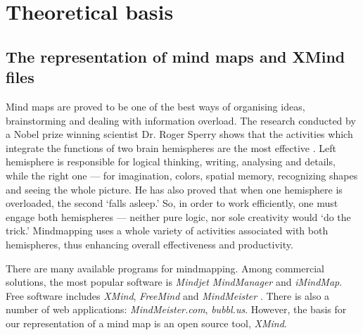%
%
%
%
%

\chapter{Theoretical basis}
\label{chap:theory}

\section{The representation of mind maps and XMind files}
\label{sec:xmind}

Mind maps are proved to be one of the best ways of organising ideas, brainstorming and dealing with information overload. The research conducted by a Nobel prize winning scientist Dr. Roger Sperry shows that the activities which integrate the functions of two brain hemispheres are the most effective \cite{Voneida:1998:Sperry}. Left hemisphere is responsible for logical thinking, writing, analysing and details, while the right one --- for imagination, colors, spatial memory, recognizing shapes and seeing the whole picture. He has also proved that when one hemisphere is overloaded, the second `falls asleep.' So, in order to work efficiently, one must engage both hemispheres --- neither pure logic, nor sole creativity would `do the trick.' Mindmapping uses a whole variety of activities associated with both hemispheres, thus enhancing overall effectiveness and productivity.

There are many available programs for mindmapping. Among commercial solutions, the most popular software is {\em Mindjet MindManager} and {\em iMindMap}. Free software includes {\em XMind}, {\em FreeMind} and \emph{MindMeister} \cite{Wiki:Software}. There is also a number of web applications: \emph{MindMeister.com}, \emph{bubbl.us}. However, the basis for our representation of a mind map is an open source tool, {\em XMind}.


